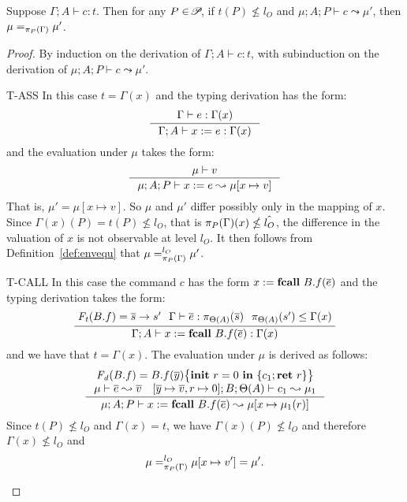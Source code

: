 {{{%

\begin{lemma}\label{lem:comsafe}
Suppose $\Gamma; A \vdash c : t$. Then for any $P\in\!\mathscr{P}\!$,
if $t(P)\nleq l_{O}$ and $\mu;A; P \vdash c \leadsto \mu' $, then
$\mu =_{\pi_{{P}}({\Gamma})} \mu'$.
\end{lemma}
\begin{proof}
By induction on the derivation of $\Gamma; A \vdash c : t$, with subinduction
on the derivation of $\mu;A; P \vdash c \leadsto \mu'.$

\begin{ProofEnumDesc}
\item[T-ASS]
In this case $t = \Gamma(x)$ and
the typing derivation has the form:
\begin{equation*}
\inference
{\Gamma \vdash e : \Gamma(x)}
{\Gamma; A  \vdash \lcASS{x}{e} : \Gamma(x)}
\end{equation*}
and the evaluation under $\mu$ takes the form:
$$
\inference
{\mu \vdash v}
{\mu; A; P \vdash \lcASS{x}{e} \leadsto \mu[x \mapsto v] }
$$
That is, $\mu' = \mu[x \mapsto v].$
So $\mu$ and $\mu'$ differ possibly
only in the mapping of $x$.
Since $\Gamma(x)(P) = t(P) \nleq l_{O}$,
that is $\pi_{{P}}({\Gamma})(x) \nleq \hat{l_{O}}$,
the difference in the valuation of $x$ is not observable
at level $l_O.$
It then follows from Definition~\ref{def:envequ}
that $\mu =_{\pi_{{P}}({\Gamma})}^{l_{O}} \mu' $.

\item[T-CALL] In this case
the command $c$ has the form
${x}:=\textbf{fcall}~{B.f}({\overline{e}})$
and the typing derivation
takes the form:
$$
\setpremisesspace{7pt}
\setpremisesend{3pt}
\inference
{
\FT(B.f) = \overline{s} \rightarrow {s'} &
\Gamma \vdash \overline{e} : \app{\overline{s}}{\Theta(A)} &
\app{s'}{\Theta(A)} \leq \Gamma(x)}
{\Gamma; A \vdash \lcCALL{x}{B.f}{\overline{e}} : \Gamma(x) }
$$
and we have that
$t = \Gamma(x).$
The evaluation under $\mu$ is derived as follows:
$$
\inference{
\FD(B.f) = \lpFUN{B.f}{\overline{y}}{c_1} \\
\mu\vdash\overline{e} \leadsto \overline{v} \quad
[\overline{y} \mapsto \overline{v}, r \mapsto 0] ; B; \Theta(A) \vdash c_1
\leadsto \mu_1
}
{\mu;A;P \vdash \lcCALL{x}{B.f}{\overline{e}} \leadsto
\mu [x \mapsto \mu_1(r) ]}
$$
Since $t(P) \not \leq l_O$ and $\Gamma(x) = t$, we have
$\Gamma(x)(P) \not \leq l_O$
and therefore $\Gamma(x) \not \leq l_O$
and
$$\mu =^{l_O}_{\pi_{{P}}({\Gamma})} \mu[x \mapsto v'] = \mu'.$$


\end{ProofEnumDesc}
\end{proof}}}}

